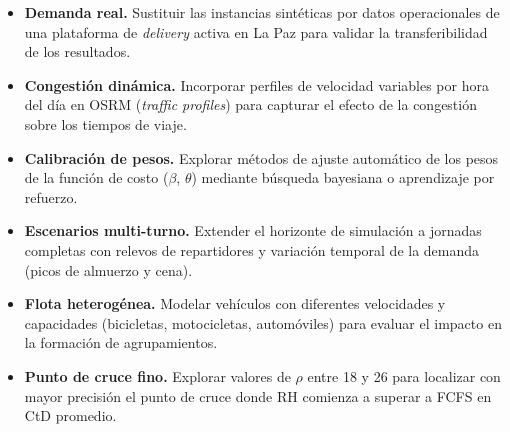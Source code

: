 \documentclass[12pt,letterpaper,oneside]{book}
\begin{document}
	\begin{itemize}
		\item \textbf{Demanda real.}  Sustituir las instancias sintéticas por datos
		      operacionales de una plataforma de \emph{delivery} activa en La Paz
		      para validar la transferibilidad de los resultados.
		\item \textbf{Congestión dinámica.}  Incorporar perfiles de velocidad
		      variables por hora del día en OSRM (\textit{traffic profiles}) para capturar
		      el efecto de la congestión sobre los tiempos de viaje.
		\item \textbf{Calibración de pesos.}  Explorar métodos de ajuste automático
		      de los pesos de la función de costo ($\beta$, $\theta$) mediante
		      búsqueda bayesiana o aprendizaje por refuerzo.
		\item \textbf{Escenarios multi-turno.}  Extender el horizonte de simulación
		      a jornadas completas con relevos de repartidores y variación temporal
		      de la demanda (picos de almuerzo y cena).
		\item \textbf{Flota heterogénea.}  Modelar vehículos con diferentes
		      velocidades y capacidades (bicicletas, motocicletas, automóviles)
		      para evaluar el impacto en la formación de agrupamientos.
		\item \textbf{Punto de cruce fino.}  Explorar valores de $\rho$ entre 18 y 26
		      para localizar con mayor precisión el punto de cruce donde RH comienza
		      a superar a FCFS en CtD promedio.
	\end{itemize}

	
	
	
\end{document}
